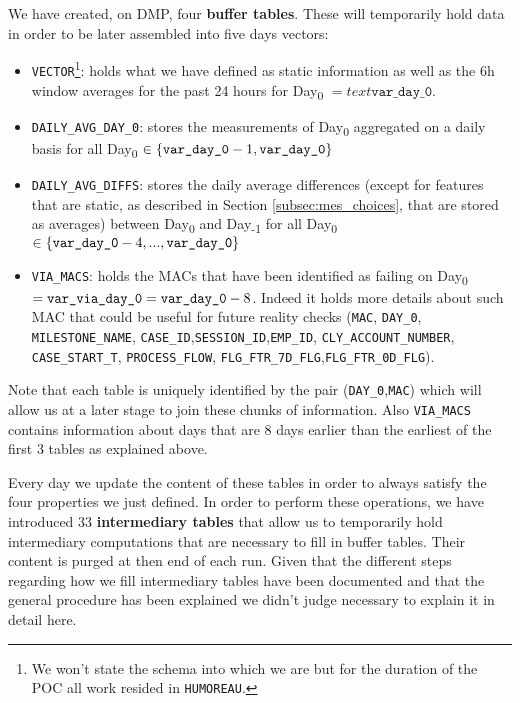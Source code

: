 We have created, on DMP, four \textbf{buffer tables}. These will temporarily hold data in order to be later assembled into five days vectors:
\begin{itemize}
	\item \texttt{VECTOR}\footnote{We won't state the schema into which we are but for the duration of the POC all work resided in \texttt{HUMOREAU}.}: holds what we have defined as static information as well as the 6h window averages for the past 24 hours for Day\textsubscript{0} $= text{\texttt{var\_day\_0}}$.
	\item \texttt{DAILY\_AVG\_DAY\_0}: stores the measurements of Day\textsubscript{0} aggregated on a daily basis for all Day\textsubscript{0} $\in \{\text{\texttt{var\_day\_0}}-1,\text{\texttt{var\_day\_0}}\}$
	\item \texttt{DAILY\_AVG\_DIFFS}: stores the daily average differences (except for features that are static, as described in Section \ref{subsec:mes_choices}, that are stored as averages) between Day\textsubscript{0} and Day\textsubscript{-1} for all Day\textsubscript{0} $\in \{\text{\texttt{var\_day\_0}}-4,...,\text{\texttt{var\_day\_0}}\}$
	\item \texttt{VIA\_MACS}: holds the MACs that have been identified as failing on Day\textsubscript{0}$=\text{\texttt{var\_via\_day\_0}} = \text{\texttt{var\_day\_0}} - 8$. Indeed it holds more details about such MAC that could be useful for future reality checks (\texttt{MAC}, \texttt{DAY\_0}, \texttt{MILESTONE\_NAME}, \texttt{CASE\_ID},\texttt{SESSION\_ID},\texttt{EMP\_ID}, \texttt{CLY\_ACCOUNT\_NUMBER}, \texttt{CASE\_START\_T}, \texttt{PROCESS\_FLOW}, \texttt{FLG\_FTR\_7D\_FLG},\texttt{FLG\_FTR\_0D\_FLG}).
\end{itemize}
Note that each table is uniquely identified by the pair (\texttt{DAY\_0},\texttt{MAC}) which will allow us at a later stage to join these chunks of information. Also \texttt{VIA\_MACS} contains information about days that are 8 days earlier than the earliest of the first 3 tables as explained above.

Every day we update the content of these tables in order to always satisfy the four properties we just defined. In order to perform these operations, we have introduced 33 \textbf{intermediary tables} that allow us to temporarily hold intermediary computations that are necessary to fill in buffer tables. Their content is purged at then end of each run. Given that the different steps regarding how we fill intermediary tables have been documented and that the general procedure has been explained we didn't judge necessary to explain it in detail here.

